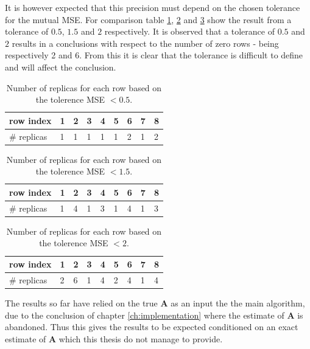 It is however expected that this precision must depend on the chosen tolerance for the mutual MSE. For comparison table \ref{tab:replica2}, \ref{tab:replica3} and \ref{tab:replica4} show the result from a tolerance of $0.5$, $1.5$ and $2$ respectively. 
It is observed that a tolerance of $0.5$ and $2$ results in a conclusions with respect to the number of zero rows -  being respectively 2 and 6. From this it is clear that the tolerance is difficult to define and will affect the conclusion.  

\begin{table}[h]
\center
\begin{tabular}{|l|l|l|l|l|l|l|l|l|}
\hline
row index   & 1 & 2 & 3 & 4 & 5 & 6 & 7 & 8 \\ \hline
\# replicas & 1 & 1 & 1 & 1 & 1 & 2 & 1 & 2 \\ \hline
\end{tabular}
\caption{Number of replicas for each row based on the tolerence MSE $< 0.5$.}
\label{tab:replica2}
\end{table}

\begin{table}[h]
\center
\begin{tabular}{|l|l|l|l|l|l|l|l|l|}
\hline
row index   & 1 & 2 & 3 & 4 & 5 & 6 & 7 & 8 \\ \hline
\# replicas & 1 & 4 & 1 & 3 & 1 & 4 & 1 & 3 \\ \hline
\end{tabular}
\caption{Number of replicas for each row based on the tolerence MSE $< 1.5$.}
\label{tab:replica3}
\end{table}

\begin{table}[h]
\center
\begin{tabular}{|l|l|l|l|l|l|l|l|l|}
\hline
row index   & 1 & 2 & 3 & 4 & 5 & 6 & 7 & 8 \\ \hline
\# replicas & 2 & 6 & 1 & 4 & 2 & 4 & 1 & 4 \\ \hline
\end{tabular}
\caption{Number of replicas for each row based on the tolerence MSE $< 2$.}
\label{tab:replica4}
\end{table}

The results so far have relied on the true $\textbf{A}$ as an input the the main algorithm, due to the conclusion of chapter \ref{ch:implementation} where the estimate of $\textbf{A}$ is abandoned. Thus this gives the results to be expected conditioned on an exact estimate of $\textbf{A}$ which this thesis do not manage to provide.

